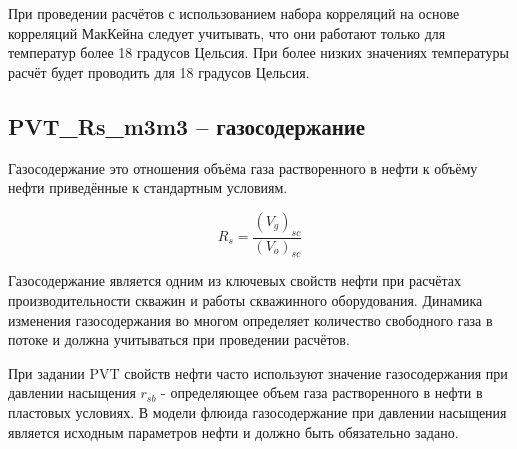 \documentclass[]{scrreprt}
\begin{document}


При проведении расчётов с использованием набора корреляций на основе корреляций МакКейна следует учитывать, что они работают только для температур более 18 градусов Цельсия. При более низких значениях температуры расчёт будет проводить для 18 градусов Цельсия. 

\subsection{PVT\_Rs\_m3m3 – газосодержание}

Газосодержание это отношения объёма газа растворенного в нефти к объёму нефти приведённые к стандартным условиям. 

$$R_s = \frac{(V_g)_{sc}}{(V_o)_{sc}}$$

Газосодержание является одним из ключевых свойств нефти при расчётах производительности скважин и работы скважинного оборудования. Динамика изменения газосодержания во многом определяет количество свободного газа в потоке и должна учитываться при проведении расчётов. 

При задании PVT свойств нефти часто используют значение газосодержания при давлении насыщения $r_{sb}$ - определяющее объем газа растворенного в нефти в пластовых условиях. В модели флюида \unf газосодержание при давлении насыщения является исходным параметров нефти и должно быть обязательно задано. 
\end{document}

